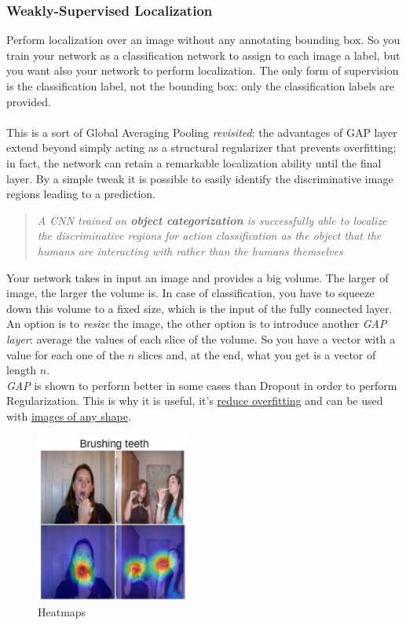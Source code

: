 \subsubsection{Weakly-Supervised Localization}
Perform localization over an image without any annotating bounding box. So you train your network as a classification network to assign to each image a label, but you want also your network to perform localization. The only form of supervision is the classification label, not the bounding box: only the classification labels are provided.\\ \\
This is a sort of Global Averaging Pooling \textit{revisited}: the advantages of GAP layer extend beyond simply acting as a structural regularizer that prevents overfitting; in fact, the network can retain a remarkable localization ability until the final layer. By a simple tweak it is possible to easily identify the discriminative image regions leading to a prediction.\\
\begin{quote}
    \textit{A CNN trained on \textbf{object categorization} is successfully able to localize the discriminative regions for action classification as the object that the humans are interacting with rather than the humans themselves}
\end{quote} 

Your network takes in input an image and provides a big volume. The larger of image, the larger the volume is. In case of classification, you have to squeeze down this volume to a fixed size, which is the input of the fully connected layer. \\
An option is to \textit{resize} the image, the other option is to introduce another \textit{GAP layer}: average the values of each slice of the volume. So you have a vector with a value for each one of the $n$ slices and, at the end, what you get is a vector of length $n$. \\
\textit{GAP} is shown to perform better in some cases than Dropout in order to perform Regularization. This is why it is useful, it's \underline{reduce overfitting} and can be used with \underline{images of any shape}. 

\begin{figure}
\includegraphics[width=5cm]{images/heatmap_localization.png}
\caption{Heatmaps}\label{wrap-fig:heatmap_loc}
\end{figure} 

